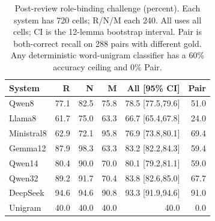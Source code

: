 \begin{table}[t]
\centering
\caption{Post-review role-binding challenge (percent). Each system has 720 cells; R/N/M each 240. All uses all cells; CI is the 12-lemma bootstrap interval. Pair is both-correct recall on 288 pairs with different gold. Any deterministic word-unigram classifier has a 60\% accuracy ceiling and 0\% Pair.}
\label{tab:binding}
\setlength{\tabcolsep}{2.5pt}
\begin{tabular}{lrrrrr}
\toprule
System & R & N & M & All [95\% CI] & Pair\\
\midrule
Qwen8 & 77.1 & 82.5 & 75.8 & 78.5 [77.5,79.6] & 51.0 \\
Llama8 & 61.7 & 75.0 & 63.3 & 66.7 [65.4,67.8] & 24.0 \\
Ministral8 & 62.9 & 72.1 & 95.8 & 76.9 [73.8,80.1] & 69.4 \\
Gemma12 & 87.9 & 98.3 & 63.3 & 83.2 [82.2,84.3] & 59.4 \\
Qwen14 & 80.4 & 90.0 & 70.0 & 80.1 [79.2,81.1] & 59.0 \\
Qwen32 & 89.2 & 91.7 & 70.4 & 83.8 [82.6,85.0] & 67.7 \\
DeepSeek & 94.6 & 94.6 & 90.8 & 93.3 [91.9,94.6] & 91.0 \\
Unigram & 40.0 & 40.0 & 40.0 & 40.0 & 0.0 \\
\bottomrule
\end{tabular}
\end{table}
